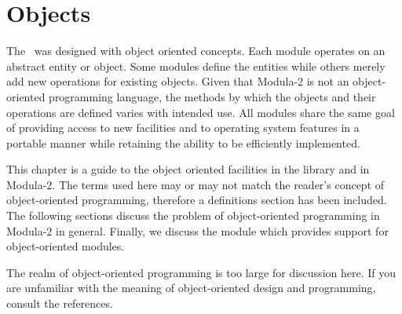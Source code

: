 %
%
%
%

\chapter{Objects}
\label{ObjectsChapter}


The \library\ was designed with object oriented
concepts.  Each module operates on an abstract entity or object.  Some
modules define the entities while others merely add new operations
for existing objects.  Given that Modula-2 is not an object-oriented
programming language, the methods
by which the objects and their operations are defined varies with 
intended use.  All modules share the same goal of providing access
to new facilities and to operating system features in a portable manner
while retaining the ability to be efficiently implemented.  

This chapter is a guide to the object oriented facilities in the 
library and in Modula-2.  The terms used here may or may not match
the reader's concept of object-oriented programming, therefore 
a definitions section has been included.  The following sections
discuss the problem of object-oriented programming in Modula-2
in general.  Finally, we discuss the module  which
provides support for object-oriented modules.

The realm of object-oriented programming is too large for discussion
here.  If you are unfamiliar with the meaning of object-oriented
design and programming, consult the references.

